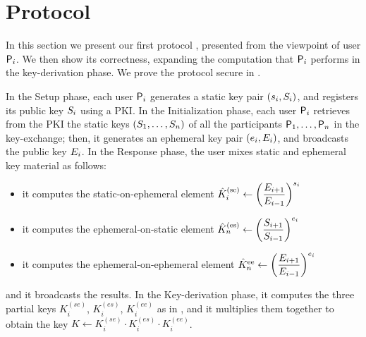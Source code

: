 \section{Protocol}\label{sec:protocol}
In this section we present our first protocol , presented from the viewpoint of user $\User[i]$.
We then show its correctness, expanding the computation that $\User[i]$ performs in the key-derivation phase.
We prove the protocol secure  in .

In the Setup phase, each user $\User[i]$ generates a static key pair $(\ssk_i,\spk_i)$, and registers its public key $\spk_i$ using a PKI.
In the Initialization phase, each user $\User[i]$ retrieves from the PKI the static keys $(\spk_1,\dots,\spk_n)$ of all the participants $\User[1],\dots,\User[n]$  in the key-exchange; then, it generates an ephemeral key pair $(\esk_i,\epk_i)$, and broadcasts the public key $\epk_i$. 
In the Response phase, the user mixes static and ephemeral key material as follows:
\begin{itemize}
	\item it computes the static-on-ephemeral element $\hat{K}_i^\text{(se)} \gets \left( \dfrac{\epk_{i+1}}{\epk_{i-1}}\right)^{\ssk_i}$
	\item it computes the ephemeral-on-static element $\hat{K}_n^\text{(es)} \gets \left( \dfrac{\spk_{i+1}}{\spk_{i-1}}\right)^{\esk_i}$
	\item it computes the ephemeral-on-ephemeral element $\hat{K}_n^\text{ee} \gets \left( \dfrac{\epk_{i+1}}{\epk_{i-1}}\right)^{\esk_i}$ 
\end{itemize}
and it broadcasts the results.
In the Key-derivation phase, it computes the three partial keys $K_i^{(se)}$, $K_i^{(es)}$, $K_i^{(ee)}$ as in , and it multiplies them together to obtain the key $K \gets K_i^{(se)} \cdot K_i^{(es)} \cdot K_i^{(ee)}$.

